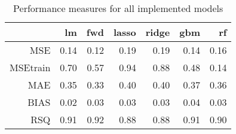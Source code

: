 \begin{table}[H]
\centering
\begin{tabular}{rrrrrrr}
  \hline
 & lm & fwd & lasso & ridge & gbm & rf \\ 
  \hline
MSE & 0.14 & 0.12 & 0.19 & 0.19 & 0.14 & 0.16 \\ 
  MSEtrain & 0.70 & 0.57 & 0.94 & 0.88 & 0.48 & 0.14 \\ 
  MAE & 0.35 & 0.33 & 0.40 & 0.40 & 0.37 & 0.36 \\ 
  BIAS & 0.02 & 0.03 & 0.03 & 0.03 & 0.04 & 0.03 \\ 
  RSQ & 0.91 & 0.92 & 0.88 & 0.88 & 0.91 & 0.90 \\ 
   \hline
\end{tabular}
\caption{Performance measures for all implemented models}
\label{tab:measures}
\end{table}
